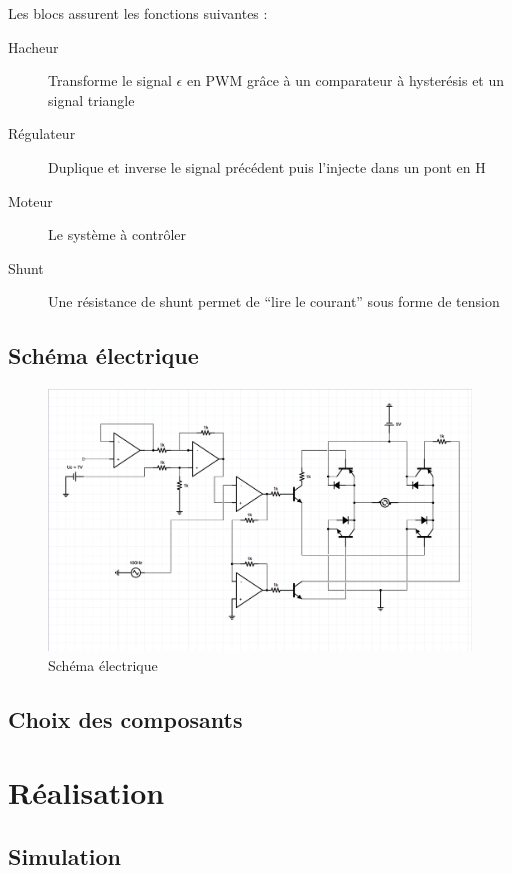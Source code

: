 \documentclass[a4paper]{article}
\begin{document}
Les blocs assurent les fonctions suivantes :
\begin{description}
  \item[Hacheur] 	Transforme le signal $\epsilon$ en PWM grâce à un comparateur à hysterésis et un signal triangle
  \item[Régulateur] Duplique et inverse le signal précédent puis l'injecte dans un pont en H
  \item[Moteur] 	Le système à contrôler
  \item[Shunt] 		Une résistance de shunt permet de “lire le courant” sous forme de tension
\end{description}

\subsection{Schéma électrique}

\begin{figure}[h!]
\centering
	\includegraphics[width=1\textwidth]{schema}
	\caption{Schéma électrique}
\end{figure}


\subsection{Choix des composants}

\section{Réalisation}

\subsection{Simulation}
\end{document}
